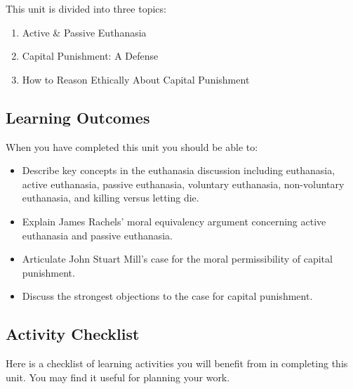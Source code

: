 \documentclass[
]{book}
\providecommand{\tightlist}{%
  \setlength{\itemsep}{0pt}\setlength{\parskip}{0pt}}
\begin{document}
This unit is divided into three topics:

\begin{enumerate}
\def\labelenumi{\arabic{enumi}.}
\tightlist
\item
  Active \& Passive Euthanasia\\
\item
  Capital Punishment: A Defense\\
\item
  How to Reason Ethically About Capital Punishment
\end{enumerate}

\hypertarget{learning-outcomes-7}{%
\subsection*{Learning Outcomes}\label{learning-outcomes-7}}

When you have completed this unit you should be able to:

\begin{itemize}
\tightlist
\item
  Describe key concepts in the euthanasia discussion including euthanasia, active euthanasia, passive euthanasia, voluntary euthanasia, non-voluntary euthanasia, and killing versus letting die.\\
\item
  Explain James Rachels' moral equivalency argument concerning active euthanasia and passive euthanasia.\\
\item
  Articulate John Stuart Mill's case for the moral permissibility of capital punishment.\\
\item
  Discuss the strongest objections to the case for capital punishment.
\end{itemize}

\hypertarget{activity-checklist-7}{%
\subsection*{Activity Checklist}\label{activity-checklist-7}}

Here is a checklist of learning activities you will benefit from in completing this unit. You may find it useful for planning your work.
\end{document}
